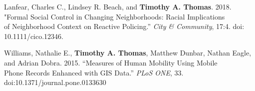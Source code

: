 

\begin{cventries}

  \cventry
    { } %
{ } %
    { } %
    { } %
    {
      \begin{cvitems} %
        Lanfear, Charles C., Lindsey R. Beach, and \textbf{Timothy A. Thomas}. 2018. "Formal Social Control in Changing Neighborhoods: Racial Implications\\
         \hspace*{.25in}of Neighborhood Context on Reactive Policing.'' \textit{City \& Community}, 17:4. doi: 10.1111/cico.12346.     
      \end{cvitems}
    }    

  \cventry
    { } %
{ } %
    { } %
    { } %
    {
      \begin{cvitems} %
        Williams, Nathalie E., \textbf{Timothy A. Thomas}, Matthew Dunbar, Nathan Eagle, and Adrian Dobra. 2015. ``Measures of Human Mobility Using Mobile\\
         \hspace*{.25in}Phone Records Enhanced with GIS Data.'' \textit{PLoS ONE}, 33. doi:10.1371/journal.pone.0133630    
      \end{cvitems}
    }    

\end{cventries}

